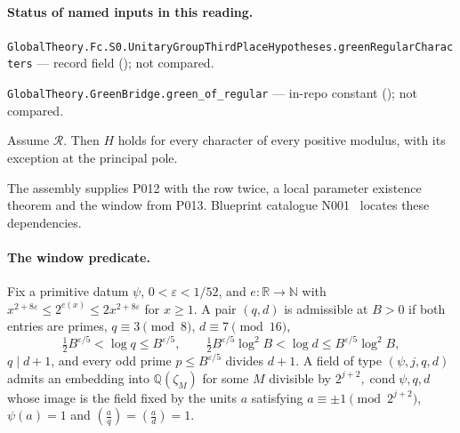 

\paragraph{Status of named inputs in this reading.}
\noindent\nolinkurl{GlobalTheory.Fc.S0.UnitaryGroupThirdPlaceHypotheses.greenRegularCharacters} --- record field (); not compared.\par
\noindent\nolinkurl{GlobalTheory.GreenBridge.green_of_regular} --- in-repo constant (); not compared.\par

\begin{formalstatement}\label{pn:P011}
Assume $\mathcal R$. Then $H$ holds for every character of every positive modulus, with its exception at the principal pole.
\end{formalstatement}
The assembly supplies P012 with the row twice, a local parameter existence theorem and the window from P013. Blueprint catalogue N001~ locates these dependencies.

\paragraph{The window predicate.} Fix a primitive datum $\psi$, $0<\varepsilon<1/52$, and $e:\mathbb R\to\mathbb N$ with $x^{2+8\varepsilon}\le2^{e(x)}\le2x^{2+8\varepsilon}$ for $x\ge1$. A pair $(q,d)$ is admissible at $B>0$ if both entries are primes, $q\equiv3\pmod8$, $d\equiv7\pmod{16}$,
\[
 \tfrac12B^{\varepsilon/5}<\log q\le B^{\varepsilon/5},\qquad
 \tfrac12B^{\varepsilon/5}\log^2 B<\log d\le B^{\varepsilon/5}\log^2 B,
\]
$q\mid d+1$, and every odd prime $p\le B^{\varepsilon/5}$ divides $d+1$. A field of type $(\psi,j,q,d)$ admits an embedding into $\mathbb Q(\zeta_M)$ for some $M$ divisible by $2^{j+2},\operatorname{cond}\psi,q,d$ whose image is the field fixed by the units $a$ satisfying $a\equiv\pm1\pmod {2^{j+2}}$, $\psi(a)=1$ and $(\tfrac aq)=(\tfrac ad)=1$.

